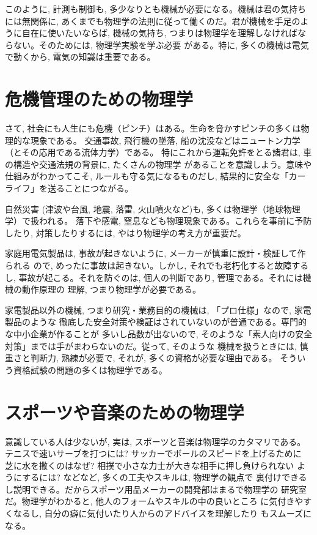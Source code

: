 このように, 計測も制御も, 多少なりとも機械が必要になる。機械は君の気持ちには無関係に, 
あくまでも物理学の法則に従って働くのだ。君が機械を手足のように自在に使いたいならば, 
機械の気持ち, つまりは物理学を理解しなければならない。そのためには, 物理学実験を学ぶ必要
がある。特に, 多くの機械は電気で動くから, 電気の知識は重要である。
\hv


\section{危機管理のための物理学}

さて, 社会にも人生にも危機（ピンチ）はある。生命を脅かすピンチの多くは物理的な現象である。
交通事故, 飛行機の墜落, 船の沈没などはニュートン力学（とその応用である流体力学）である。
特にこれから運転免許をとる諸君は, 車の構造や交通法規の背景に, たくさんの物理学
があることを意識しよう。意味や仕組みがわかってこそ, ルールも守る気になるものだし, 
結果的に安全な「カーライフ」を送ることにつながる。

自然災害 (津波や台風, 地震, 落雷, 火山噴火など)も, 多くは物理学（地球物理学）で扱われる。
落下や感電, 窒息なども物理現象である。これらを事前に予防したり, 対策したりするには, 
やはり物理学の考え方が重要だ。

家庭用電気製品は, 事故が起きないように, メーカーが慎重に設計・検証して作られる
ので, めったに事故は起きない。しかし, それでも老朽化すると故障するし, 
事故が起こる。それを防ぐのは, 個人の判断であり, 管理である。それには機械の動作原理の
理解, つまり物理学が必要である。

家電製品以外の機械, つまり研究・業務目的の機械は, 「プロ仕様」なので, 家電製品のような
徹底した安全対策や検証はされていないのが普通である。専門的な中小企業が作ることが
多いし品数が出ないので, そのような「素人向けの安全対策」までは手がまわらないのだ。従って, そのような
機械を扱うときには, 慎重さと判断力, 熟練が必要で, それが, 多くの資格が必要な理由である。
そういう資格試験の問題の多くは物理学である。
\hv


\section{スポーツや音楽のための物理学}

意識している人は少ないが, 実は, スポーツと音楽は物理学のカタマリである。
テニスで速いサーブを打つには? サッカーでボールのスピードを上げるために
芝に水を撒くのはなぜ? 相撲で小さな力士が大きな相手に押し負けられない
ようにするには? などなど, 多くの工夫やスキルは, 物理学の観点で
裏付けできるし説明できる。だからスポーツ用品メーカーの開発部はまるで物理学の
研究室だ。物理学がわかると, 他人のフォームやスキルの中の良いところ
に気付きやすくなるし, 自分の癖に気付いたり人からのアドバイスを理解したり
もスムーズになる。\mv

